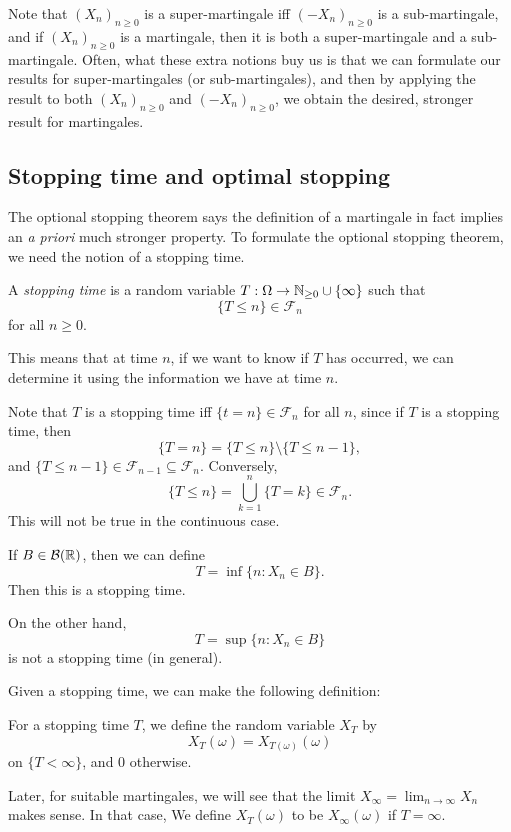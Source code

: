 \documentclass[a4paper]{article}
\begin{document}
Note that $(X_n)_{n \geq 0}$ is a super-martingale iff $(-X_n)_{n \geq 0}$ is a sub-martingale, and if $(X_n)_{n \geq 0}$ is a martingale, then it is both a super-martingale and a sub-martingale. Often, what these extra notions buy us is that we can formulate our results for super-martingales (or sub-martingales), and then by applying the result to both $(X_n)_{n \geq 0}$ and $(-X_n)_{n \geq 0}$, we obtain the desired, stronger result for martingales.

\subsection{Stopping time and optimal stopping}
The optional stopping theorem says the definition of a martingale in fact implies an \emph{a priori} much stronger property. To formulate the optional stopping theorem, we need the notion of a stopping time.

\begin{defi}
  A \emph{stopping time} is a random variable $T: \Omega \to \mathbb{N}_{ \geq 0} \cup \{\infty\}$ such that
  \[
    \{T \leq n\} \in \mathcal{F}_n
  \]
  for all $n \geq 0$.
\end{defi}
This means that at time $n$, if we want to know if $T$ has occurred, we can determine it using the information we have at time $n$.

Note that $T$ is a stopping time iff $\{t = n \} \in \mathcal{F}_n$ for all $n$, since if $T$ is a stopping time, then
\[
  \{T = n\} = \{T \leq n\} \setminus \{T \leq n - 1\},
\]
and $\{T \leq n- 1\} \in \mathcal{F}_{n - 1} \subseteq \mathcal{F}_n$. Conversely,
\[
  \{T \leq n \} = \bigcup_{k = 1}^n \{T = k\} \in \mathcal{F}_n.
\]
This will not be true in the continuous case.

\begin{eg}
  If $B \in \mathcal{B}(\mathbb{R})$, then we can define
  \[
    T = \inf \{n : X_n \in B\}.
  \]
  Then this is a stopping time.

  On the other hand,
  \[
    T = \sup \{n: X_n \in B\}
  \]
  is not a stopping time (in general).
\end{eg}

Given a stopping time, we can make the following definition:
\begin{defi}[$X_T$]
  For a stopping time $T$, we define the random variable $X_T$ by
  \[
    X_T (\omega) = X_{T(\omega)}(\omega)
  \]
  on $\{T < \infty\}$, and $0$ otherwise.
\end{defi}
Later, for suitable martingales, we will see that the limit $X_\infty = \lim_{n \to \infty} X_n$ makes sense. In that case, We define $X_T(\omega)$ to be $X_\infty(\omega)$ if $T = \infty$.
\end{document}

